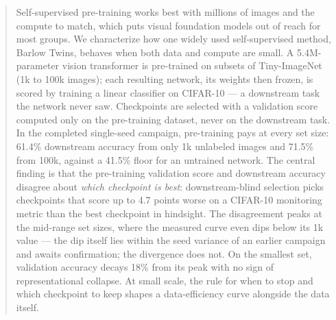 \begin{abstract}
Self-supervised pre-training works best with millions of images and the
compute to match, which puts visual foundation models out of reach for most
groups. We characterize how one widely used self-supervised method, Barlow
Twins, behaves when both data and compute are small. A 5.4M-parameter vision
transformer is pre-trained on subsets of Tiny-ImageNet (1k to 100k images);
each resulting network, its weights then frozen, is scored by training a
linear classifier on CIFAR-10 --- a downstream task the network never saw.
Checkpoints are selected with a validation score computed only on the
pre-training dataset, never on the downstream task. In the completed
single-seed campaign, pre-training pays at every set size: 61.4\% downstream
accuracy from only 1k unlabeled images and 71.5\% from 100k, against a
41.5\% floor for an untrained network. The central finding is that the
pre-training validation score and downstream accuracy disagree about
\emph{which checkpoint is best}: downstream-blind selection picks
checkpoints that score up to 4.7 points worse on a CIFAR-10 monitoring
metric than the best checkpoint in hindsight. The disagreement peaks at the
mid-range set sizes, where the measured curve even dips below its 1k value
--- the dip itself lies within the seed variance of an earlier campaign and
awaits confirmation; the divergence does not. On the smallest set,
validation accuracy decays 18\% from its peak with no sign of
representational collapse. At small scale, the rule for when to stop and
which checkpoint to keep shapes a data-efficiency curve alongside the data
itself.
\end{abstract}
